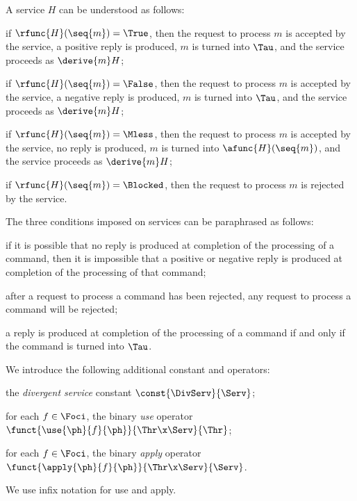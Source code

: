 \documentclass[fleqn]{llncs}
\begin{document}
A service $H$ can be understood as follows:
\begin{iteml}
\item
if $\rfunc{H}(\seq{m}) = \True$, then the request to process $m$ is
accepted by the service, a positive reply is produced, $m$ is turned into
$\Tau$, and the service proceeds as $\derive{m}H$;
\item
if $\rfunc{H}(\seq{m}) = \False$, then the request to process $m$ is
accepted by the service, a negative reply is produced, $m$ is turned into
$\Tau$, and the service proceeds as $\derive{m}H$;
\item
if $\rfunc{H}(\seq{m}) = \Mless$, then the request to process $m$ is
accepted by the service, no reply is produced, $m$ is turned into
$\afunc{H}(\seq{m})$, and the service proceeds as $\derive{m}H$;
\item
if $\rfunc{H}(\seq{m}) = \Blocked$, then the request to process $m$ is
rejected by the service.
\end{iteml}
The three conditions imposed on services can be paraphrased as follows:
\begin{iteml}
\item
if it is possible that no reply is produced at completion of the
processing of a command, then it is impossible that a positive or
negative reply is produced at completion of the processing of that
command;
\item
after a request to process a command has been rejected, any request to
process a command will be rejected;
\item
a reply is produced at completion of the processing of a command if and
only if the command is turned into $\Tau$.
\end{iteml}

We introduce the following additional constant and operators:
\begin{iteml}
\item
the \emph{divergent service} constant $\const{\DivServ}{\Serv}$;
\item
for each $f \in \Foci$, the binary \emph{use} operator
$\funct{\use{\ph}{f}{\ph}}{\Thr \x \Serv}{\Thr}$;
\item
for each $f \in \Foci$, the binary \emph{apply} operator
$\funct{\apply{\ph}{f}{\ph}}{\Thr \x \Serv}{\Serv}$.
\end{iteml}
We use infix notation for use and apply.
\end{document}
